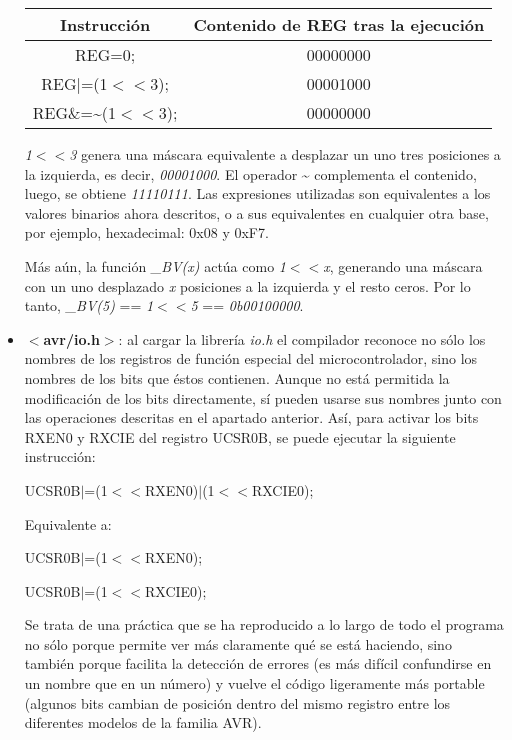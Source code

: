 \begin{itemize}
{\begin{center}
\begin{tabular}[c]{ c | c }
Instrucción & Contenido de REG tras la ejecución \\ \hline
REG=0;			& 00000000 \\
REG$|$=(1$<<$3);	& 00001000 \\
REG\&=\~{}(1$<<$3);   	& 00000000 \\
\end{tabular}
\end{center}

\textit{1$<<$3} genera una máscara equivalente a desplazar un uno tres posiciones a la izquierda, es decir, \textit{00001000}. El operador \~{} complementa el contenido, luego, se obtiene \textit{11110111}. Las expresiones utilizadas son equivalentes a los valores binarios ahora descritos, o a sus equivalentes en cualquier otra base, por ejemplo, hexadecimal: 0x08 y 0xF7.

Más aún, la función \textit{\_BV(x)} actúa como \textit{1$<<$x}, generando una máscara con un uno desplazado \textit{x} posiciones a la izquierda y el resto ceros. Por lo tanto, \textit{\_BV(5)} == \textit{1$<<$5} == \textit{0b00100000}.
}
  \item{\textbf{$<$avr/io.h$>$}: al cargar la librería \textit{io.h} el compilador reconoce no sólo los nombres de los registros de función especial del microcontrolador, sino los nombres de los bits que éstos contienen. Aunque no está permitida la modificación de los bits directamente, sí pueden usarse sus nombres junto con las operaciones descritas en el apartado anterior. Así, para activar los bits RXEN0 y RXCIE del registro UCSR0B, se puede ejecutar la siguiente instrucción:

\begin{center}
UCSR0B$|$=(1$<<$RXEN0)$|$(1$<<$RXCIE0);
\end{center}

Equivalente a:

\begin{center}
UCSR0B$|$=(1$<<$RXEN0);

UCSR0B$|$=(1$<<$RXCIE0);
\end{center}

Se trata de una práctica que se ha reproducido a lo largo de todo el programa no sólo porque permite ver más claramente qué se está haciendo, sino también porque facilita la detección de errores (es más difícil confundirse en un nombre que en un número) y vuelve el código ligeramente más portable (algunos bits cambian de posición dentro del mismo registro entre los diferentes modelos de la familia AVR).
}
\end{itemize}


